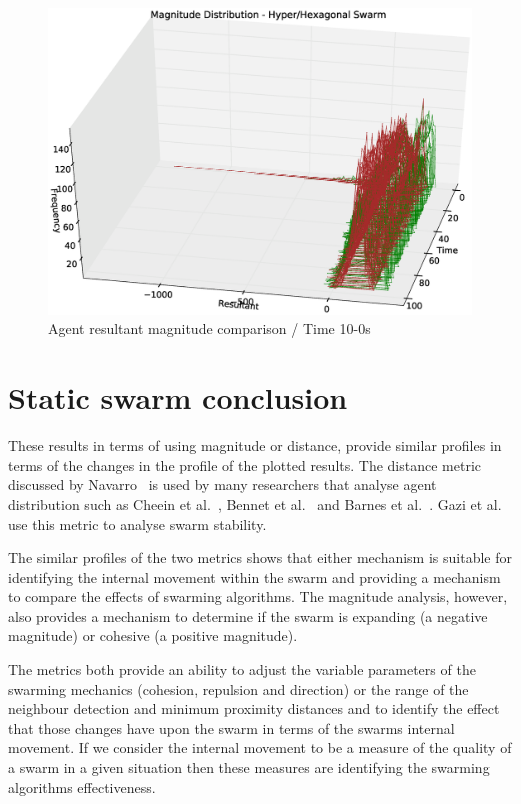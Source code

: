 \begin{figure}[H]
\begin{center}
\includegraphics[width=13cm]{CHAPTER-5/figures/StabilityMagHyperHexagonal3D2}
\end{center}
\caption{Agent resultant magnitude comparison / Time 10-0s\label{methods:StabilityMagHyperHexagonal3D2}}
\end{figure}

\section{Static swarm conclusion\label{section:staticConclusion}}
These results in terms of using magnitude or distance, provide similar profiles in terms of the changes in the profile of the plotted results. The distance metric discussed by Navarro~\cite{NIM:09} is used by many researchers that analyse agent distribution such as Cheein et al.~\cite{HGCTREA:15}, Bennet et al.~\cite{BM:09} and Barnes et al.~\cite{BAF:06, BAFVM:06, BFV:07, BFV:09}. Gazi et al.~\cite{GP:02, GP:04, GP:04a, GP:05} use this metric to analyse swarm stability. 

The similar profiles of the two metrics shows that either mechanism is suitable for identifying the internal movement within the swarm and providing a mechanism to compare the effects of swarming algorithms. The magnitude analysis, however, also provides a mechanism to determine if the swarm is expanding (a negative magnitude) or cohesive (a positive magnitude).

The metrics both provide an ability to adjust the variable parameters of the swarming mechanics (cohesion, repulsion and direction) or the range of the neighbour detection and minimum proximity distances and to identify the effect that those changes have upon the swarm in terms of the swarms internal movement. If we consider the internal movement to be a measure of the quality of a swarm in a given situation then these measures are identifying the swarming algorithms effectiveness.


